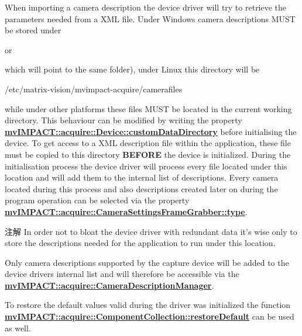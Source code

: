 When importing a camera description the device driver will try to retrieve the parameters needed from a X\+M\+L file. Under Windows\textregistered{} camera descriptions M\+U\+S\+T be stored under 
\begin{DoxyCode}
\end{DoxyCode}
 or 
\begin{DoxyCode}
\end{DoxyCode}
 which will point to the same folder), under Linux\textregistered{} this directory will be 
\begin{DoxyCode}
/etc/matrix-vision/mvimpact-acquire/camerafiles
\end{DoxyCode}
 while under other platforms these files M\+U\+S\+T be located in the current working directory. This behaviour can be modified by writing the property {\bfseries \hyperlink{classmv_i_m_p_a_c_t_1_1acquire_1_1_device_a356137fa9ec71b56e7981276aaf3c4f2}{mv\+I\+M\+P\+A\+C\+T\+::acquire\+::\+Device\+::custom\+Data\+Directory}} before initialising the device. To get access to a X\+M\+L description file within the application, these file must be copied to this directory {\bfseries B\+E\+F\+O\+R\+E} the device is initialized. During the initialisation process the device driver will process every file located under this location and will add them to the internal list of descriptions. Every camera located during this process and also descriptions created later on during the program operation can be selected via the property {\bfseries \hyperlink{classmv_i_m_p_a_c_t_1_1acquire_1_1_camera_settings_frame_grabber_a3cf5c97b03127b143d79619658e2edb9}{mv\+I\+M\+P\+A\+C\+T\+::acquire\+::\+Camera\+Settings\+Frame\+Grabber\+::type}}.

\begin{DoxyNote}{注解}
In order not to bloat the device driver with redundant data it's wise only to store the descriptions needed for the application to run under this location.

Only camera descriptions supported by the capture device will be added to the device drivers internal list and will therefore be accessible via the {\bfseries \hyperlink{classmv_i_m_p_a_c_t_1_1acquire_1_1_camera_description_manager}{mv\+I\+M\+P\+A\+C\+T\+::acquire\+::\+Camera\+Description\+Manager}}.
\end{DoxyNote}
To restore the default values valid during the driver was initialized the function {\bfseries \hyperlink{classmv_i_m_p_a_c_t_1_1acquire_1_1_component_collection_a986cf6758394195fb4f47e8b5b9d0c8a}{mv\+I\+M\+P\+A\+C\+T\+::acquire\+::\+Component\+Collection\+::restore\+Default}} can be used as well.

